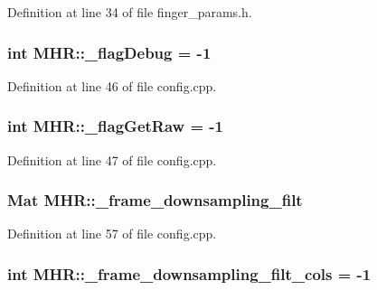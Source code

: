 Definition at line 34 of file finger\+\_\+params.\+h.

\hypertarget{namespace_m_h_r_ae2f1f5bafa06074dcb8f0af01a058c81}{
\subsubsection[{\+\_\+flag\+Debug}]{\setlength{\rightskip}{0pt plus 5cm}int M\+H\+R\+::\+\_\+flag\+Debug = -\/1}}\label{namespace_m_h_r_ae2f1f5bafa06074dcb8f0af01a058c81}


Definition at line 46 of file config.\+cpp.

\hypertarget{namespace_m_h_r_ab142c69d1b89170b4fa2533a6f749394}{
\subsubsection[{\+\_\+flag\+Get\+Raw}]{\setlength{\rightskip}{0pt plus 5cm}int M\+H\+R\+::\+\_\+flag\+Get\+Raw = -\/1}}\label{namespace_m_h_r_ab142c69d1b89170b4fa2533a6f749394}


Definition at line 47 of file config.\+cpp.

\hypertarget{namespace_m_h_r_a8d2bbf36755f538d9b442b415d5cde6d}{
\subsubsection[{\+\_\+frame\+\_\+downsampling\+\_\+filt}]{\setlength{\rightskip}{0pt plus 5cm}Mat M\+H\+R\+::\+\_\+frame\+\_\+downsampling\+\_\+filt}}\label{namespace_m_h_r_a8d2bbf36755f538d9b442b415d5cde6d}


Definition at line 57 of file config.\+cpp.

\hypertarget{namespace_m_h_r_a619373c68caeeba93f71d9eaeecf1a5b}{
\subsubsection[{\+\_\+frame\+\_\+downsampling\+\_\+filt\+\_\+cols}]{\setlength{\rightskip}{0pt plus 5cm}int M\+H\+R\+::\+\_\+frame\+\_\+downsampling\+\_\+filt\+\_\+cols = -\/1}}\label{namespace_m_h_r_a619373c68caeeba93f71d9eaeecf1a5b}


